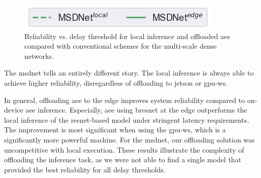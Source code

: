 \begin{figure}
	\captionsetup[subfigure]{justification=centering, farskip=0pt,captionskip=0pt}
	\centering
	\includegraphics[width=.3\linewidth]{figures/edge/gpu_msdnet_offloading_vs_local_legend}
	\hfill
	\hfill
	\caption[Offloading comparison of multi-scale dense networks]{Reliability vs. delay threshold for local inference and offloaded \gls{aee} compared with conventional schemes for the multi-scale dense networks.}
	\label{fig:msdnet-offloading-vs-local}
\end{figure}

The \gls{msdnet} tells an entirely different story. The local inference is always able to achieve higher reliability, disregardless of offloading to \gls{jetson} or \gls{gpu-ws}. 

In general, offloading \gls{aee} to the edge improves system reliability compared to on-device \gls{aee} inference. Especially, \gls{aee} using \gls{bresnet} at the edge outperforms the local inference of the \gls{resnet}-based model under stringent latency requirements. The improvement is most significant when using the \gls{gpu-ws}, which is a significantly more powerful machine. For the \gls{msdnet}, our offloading solution was uncompetitive with local execution. These results illustrate the complexity of offloading the inference task, as we were not able to find a single model that provided the best reliability for all delay thresholds.

